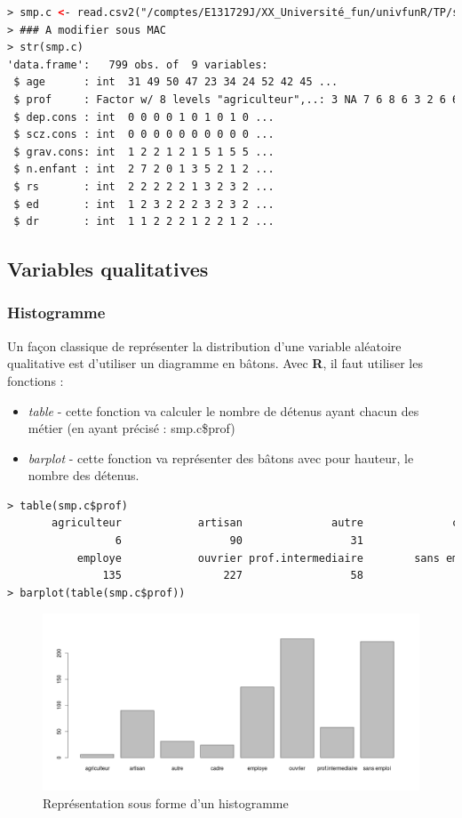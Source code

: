 \begin{lstlisting}[language=html]
> smp.c <- read.csv2("/comptes/E131729J/XX_Université_fun/univfunR/TP/smp1.csv")
> ### A modifier sous MAC
> str(smp.c)
'data.frame':	799 obs. of  9 variables:
 $ age      : int  31 49 50 47 23 34 24 52 42 45 ...
 $ prof     : Factor w/ 8 levels "agriculteur",..: 3 NA 7 6 8 6 3 2 6 6 ...
 $ dep.cons : int  0 0 0 0 1 0 1 0 1 0 ...
 $ scz.cons : int  0 0 0 0 0 0 0 0 0 0 ...
 $ grav.cons: int  1 2 2 1 2 1 5 1 5 5 ...
 $ n.enfant : int  2 7 2 0 1 3 5 2 1 2 ...
 $ rs       : int  2 2 2 2 2 1 3 2 3 2 ...
 $ ed       : int  1 2 3 2 2 2 3 2 3 2 ...
 $ dr       : int  1 1 2 2 2 1 2 2 1 2 ...
\end{lstlisting}
\subsection{Variables qualitatives}
\subsubsection{Histogramme}
Un façon classique de représenter la distribution d'une variable aléatoire qualitative est d'utiliser un diagramme en bâtons. Avec \textbf{R}, il faut utiliser les fonctions : 
\begin{itemize}
\item \textit{table} - cette fonction va calculer le nombre de détenus ayant chacun des métier (en ayant précisé : smp.c\$prof) 
\item \textit{barplot} - cette fonction va représenter des bâtons avec pour hauteur, le nombre des détenus.
\end{itemize}
\begin{lstlisting}[language=html]
> table(smp.c$prof)
       agriculteur            artisan              autre              cadre 
                 6                 90                 31                 24 
           employe            ouvrier prof.intermediaire        sans emploi 
               135                227                 58                222 
> barplot(table(smp.c$prof))

\end{lstlisting}
\begin{figure}[H]\begin{center}\includegraphics[scale=0.3]{ilu/tp1.png}\caption{Représentation sous forme d'un histogramme}\end{center}\end{figure}
